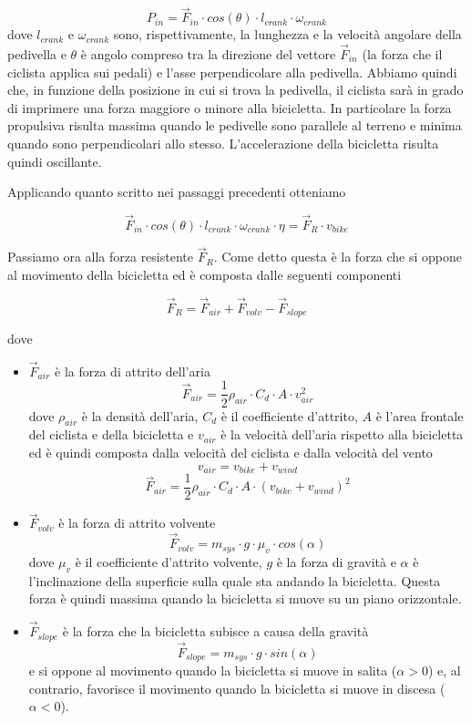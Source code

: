 \documentclass[class=article]{standalone}
\begin{document}
	\[P_{in}=\vec{F}_{in}\cdot cos(\theta)\cdot l_{crank}\cdot\omega_{crank}\]
	dove \(l_{crank}\) e \(\omega_{crank}\) sono, rispettivamente, la lunghezza e la velocità angolare della pedivella e \(\theta\) è angolo compreso tra la direzione del vettore \(\vec{F}_{in}\) (la forza che il ciclista applica sui pedali) e l'asse perpendicolare alla pedivella. Abbiamo quindi che, in funzione della posizione in cui si trova la pedivella, il ciclista sarà in grado di imprimere una forza maggiore o minore alla bicicletta. In particolare la forza propulsiva risulta massima quando le pedivelle sono parallele al terreno e minima quando sono perpendicolari allo stesso. L'accelerazione della bicicletta risulta quindi oscillante.
	
	Applicando quanto scritto nei passaggi precedenti otteniamo
	
	\[\vec{F}_{in}\cdot cos(\theta)\cdot l_{crank}\cdot \omega_{crank}\cdot\eta=\vec{F}_{R}\cdot v_{bike}\]
	
	Passiamo ora alla forza resistente \(\vec{F}_{R}\). Come detto questa è la forza che si oppone al movimento della bicicletta ed è composta dalle seguenti componenti
	
	\[\vec{F}_{R}=\vec{F}_{air}+\vec{F}_{volv}-\vec{F}_{slope}\]
	
	dove	
	\begin{itemize}
		\item \(\vec{F}_{air}\) è la forza di attrito dell'aria
		\[\vec{F}_{air}=\frac{1}{2}\rho_{air}\cdot C_{d}\cdot A\cdot v_{air}^2\]
		dove \(\rho_{air}\) è la densità dell'aria, \(C_{d}\) è il coefficiente d'attrito, \(A\) è l'area frontale del ciclista e della bicicletta e \(v_{air}\) è la velocità dell'aria rispetto alla bicicletta ed è quindi composta dalla velocità del ciclista e dalla velocità del vento 
		\[v_{air}=v_{bike}+v_{wind}\]
		\[\vec{F}_{air}=\frac{1}{2}\rho_{air}\cdot C_{d}\cdot A\cdot (v_{bike}+v_{wind})^2\]
		
		\item \(\vec{F}_{volv}\) è la forza di attrito volvente
		\[\vec{F}_{volv}=m_{sys}\cdot g\cdot \mu_{v}\cdot cos(\alpha)\]
		dove \(\mu_{v}\) è il coefficiente d'attrito volvente, \(g\) è la forza di gravità e \(\alpha\) è l'inclinazione della superficie sulla quale sta andando la bicicletta. Questa forza è quindi massima quando la bicicletta si muove su un piano orizzontale.
		
		\item \(\vec{F}_{slope}\) è la forza che la bicicletta subisce a causa della gravità
		\[\vec{F}_{slope}=m_{sys}\cdot g\cdot sin(\alpha)\]
		e si oppone al movimento quando la bicicletta si muove in salita (\(\alpha > 0\)) e, al contrario, favorisce il movimento quando la bicicletta si muove in discesa (\(\alpha < 0\)).
	\end{itemize}
	
\end{document}
